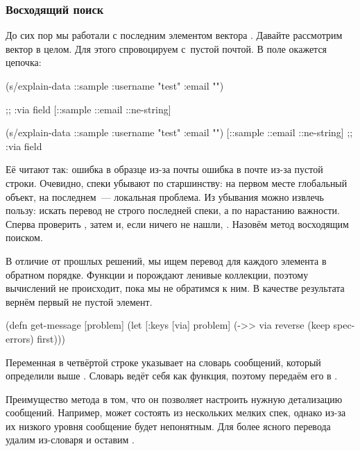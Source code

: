 \subsubsection*{Восходящий поиск}

До сих пор мы работали с последним элементом вектора . Давайте
рассмотрим вектор в целом. Для этого спровоцируем  с~пустой
почтой. В поле  окажется цепочка:

\ifnarrow

\begin{clojure}
(s/explain-data ::sample
  {:username "test" :email ""})

;; :via field
[::sample ::email ::ne-string]
\end{clojure}

\else

\begin{clojure}
(s/explain-data ::sample {:username "test" :email ""})
[::sample ::email ::ne-string] ;; :via field
\end{clojure}

\fi

Её читают так: ошибка в образце из-за почты \arr{} ошибка в почте из-за
пустой строки. Очевидно, спеки убывают по старшинству: на первом месте
глобальный объект, на последнем~--- локальная проблема. Из убывания можно
извлечь пользу: искать перевод не строго последней спеки, а по нарастанию
важности. Сперва проверить , затем  и, если
ничего не нашли, . Назовём метод восходящим поиском.


В отличие от прошлых решений, мы ищем перевод для каждого элемента в обратном
порядке. Функции  и  порождают ленивые коллекции,
поэтому вычислений не происходит, пока мы не обратимся к ним. В качестве
результата вернём первый не пустой элемент.

\begin{clojure/lines}
(defn get-message
  [problem]
  (let [{:keys [via]} problem]
    (->> via
         reverse
         (keep spec-errors)
         first)))
\end{clojure/lines}

Переменная  в четвёртой строке указывает на словарь сообщений,
который определили выше . Словарь ведёт себя как функция,
поэтому передаём его в .

Преимущество метода в том, что он позволяет настроить нужную детализацию
сообщений. Например,  может состоять из нескольких мелких спек,
однако из-за их низкого уровня сообщение будет непонятным. Для более ясного
перевода удалим из-словаря  и оставим .

